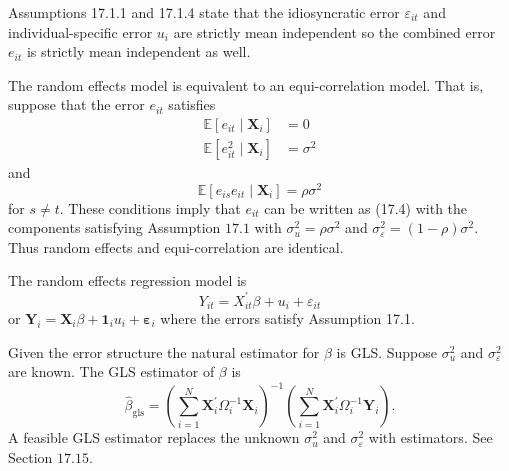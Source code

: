 \documentclass[10pt]{article}
\begin{document}
Assumptions 17.1.1 and 17.1.4 state that the idiosyncratic error $\varepsilon_{i t}$ and individual-specific error $u_{i}$ are strictly mean independent so the combined error $e_{i t}$ is strictly mean independent as well.

The random effects model is equivalent to an equi-correlation model. That is, suppose that the error $e_{i t}$ satisfies
$$
\begin{aligned}
\mathbb{E}\left[e_{i t} \mid \boldsymbol{X}_{i}\right] &=0 \\
\mathbb{E}\left[e_{i t}^{2} \mid \boldsymbol{X}_{i}\right] &=\sigma^{2}
\end{aligned}
$$
and
$$
\mathbb{E}\left[e_{i s} e_{i t} \mid \boldsymbol{X}_{i}\right]=\rho \sigma^{2}
$$
for $s \neq t$. These conditions imply that $e_{i t}$ can be written as (17.4) with the components satisfying Assumption $17.1$ with $\sigma_{u}^{2}=\rho \sigma^{2}$ and $\sigma_{\varepsilon}^{2}=(1-\rho) \sigma^{2}$. Thus random effects and equi-correlation are identical.

The random effects regression model is
$$
Y_{i t}=X_{i t}^{\prime} \beta+u_{i}+\varepsilon_{i t}
$$
or $\boldsymbol{Y}_{i}=\boldsymbol{X}_{i} \beta+\mathbf{1}_{i} u_{i}+\boldsymbol{\varepsilon}_{i}$ where the errors satisfy Assumption 17.1.

Given the error structure the natural estimator for $\beta$ is GLS. Suppose $\sigma_{u}^{2}$ and $\sigma_{\varepsilon}^{2}$ are known. The GLS estimator of $\beta$ is
$$
\widehat{\beta}_{\mathrm{gls}}=\left(\sum_{i=1}^{N} \boldsymbol{X}_{i}^{\prime} \Omega_{i}^{-1} \boldsymbol{X}_{i}\right)^{-1}\left(\sum_{i=1}^{N} \boldsymbol{X}_{i}^{\prime} \Omega_{i}^{-1} \boldsymbol{Y}_{i}\right) .
$$
A feasible GLS estimator replaces the unknown $\sigma_{u}^{2}$ and $\sigma_{\varepsilon}^{2}$ with estimators. See Section $17.15$.
\end{document}
